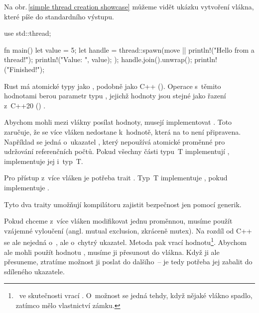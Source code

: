\documentclass[main.tex]{subfiles}
\begin{document}
Na obr.\,\ref{simple thread creation showcase} můžeme vidět ukázku vytvoření vlákna, které
píše do standardního výstupu.

\obrazek
\begin{rustcode}
    use std::thread;

    fn main() {
        let value = 5;
        let handle = thread::spawn(move || {
            println!("Hello from a thread!");
            println!("Value: {}", value);
        });
        handle.join().unwrap();
        println!("Finished!");
    }
\end{rustcode}


Rust má atomické typy jako , podobně jako C++ ().
Operace s~těmito hodnotami berou parametr typu , jejichž hodnoty jsou
stejné jako řazení z~C++20 () \cite[sync/atomic]{ruststd}.


Abychom mohli mezi vlákny posílat hodnoty, musejí implementovat . Toto
zaručuje, že se více vláken nedostane k~hodnotě, která na to není připravena. Například se
jedná o~ukazatel , který nepoužívá atomické proměnné pro udržování
referenčních počtů. Pokud všechny části typu~T implementují , implementuje jej
i~typ~T. \cite[marker/trait.Send]{ruststd}

Pro přístup z~více vláken je potřeba trait . Typ~T implementuje ,
pokud  implementuje . \cite[marker/trait.Sync]{ruststd}

Tyto dva traity umožňují kompilátoru zajistit bezpečnost jen pomocí generik.


Pokud chceme z~více vláken modifikovat jednu proměnnou, musíme použít vzájemné vyloučení
(angl. mutual exclusion, zkráceně mutex). Na rozdíl od C++ se ale nejedná o~,
ale o~chytrý ukazatel. Metoda  pak vrací hodnotu\footnote{~ve skutečnosti
    vrací . O~možnost  se jedná tehdy, když nějaké vlákno spadlo,
    zatímco mělo vlastnictví zámku.
}. Abychom ale mohli použít hodnotu , musíme ji přesunout do vlákna. Když
ji ale přesuneme, ztratíme možnost ji poslat do dalšího~-- je tedy potřeba jej zabalit
do sdíleného ukazatele.
\end{document}

